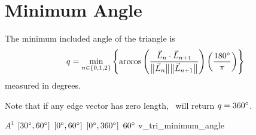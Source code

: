 \section{Minimum Angle\label{s:tri-min-angle}}

The minimum included angle of the triangle is
\[
  q =
    \min_{n\in\{0,1,2\}}\left\{\arccos{\left(
      \frac{\vec L_n\cdot\vec L_{n+1}}{\big\lVert{\vec L_n}\big\rVert\big\lVert{\vec L_{n+1}}\big\rVert}
    \right)}\left(\frac{180^{\circ}}{\pi}\right)\right\}
\]
measured in degrees.

Note that if any edge vector has zero length, \verd\ will return $q = 360^{\circ}$.

%
{$A^1$}%
{$[30^{\circ},60^{\circ}]$}%
{$[0^{\circ},60^{\circ}]$}%
{$[0^{\circ},360^{\circ}]$}%
{$60^{\circ}$}%
{\cite{pebay:03}}%
{v\_tri\_minimum\_angle}%

